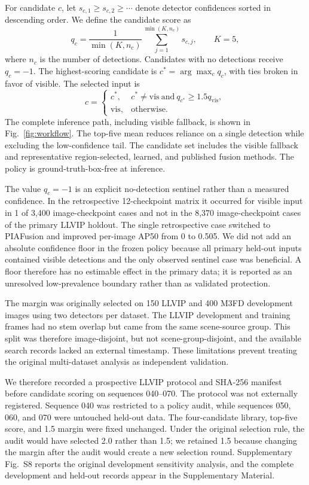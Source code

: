 \documentclass[preprint,11pt]{elsarticle}
\begin{document}
For candidate \(c\), let \(s_{c,1}\ge s_{c,2}\ge\cdots\) denote detector
confidences sorted in descending order. We define the candidate score as
\begin{equation}
q_c=\frac{1}{\min(K,n_c)}
\sum_{j=1}^{\min(K,n_c)}s_{c,j},
\qquad K=5,
\end{equation}
where \(n_c\) is the number of detections. Candidates with no detections receive
\(q_c=-1\). The highest-scoring candidate is
\(c^\ast=\arg\max_c q_c\), with ties broken in favor of visible. The selected
input is
\begin{equation}
c=
\begin{cases}
c^\ast, & c^\ast\ne\mathrm{vis}\ \text{and}\ q_{c^\ast}\ge1.5q_{\mathrm{vis}},\\
\mathrm{vis}, & \text{otherwise}.
\end{cases}
\end{equation}
The complete inference path, including visible fallback, is shown in
Fig.~\ref{fig:workflow}. The top-five mean reduces reliance on a single
detection while excluding the low-confidence tail. The candidate set includes
the visible fallback and representative region-selected, learned, and published
fusion methods. The policy is ground-truth-box-free at inference.

The value \(q_c=-1\) is an explicit no-detection sentinel rather than a
measured confidence. In the retrospective 12-checkpoint matrix it occurred for
visible input in 1 of 3,400 image-checkpoint cases and not in the 8,370
image-checkpoint cases of the primary LLVIP holdout. The single retrospective
case switched to PIAFusion and improved per-image AP50 from 0 to 0.505. We did
not add an absolute confidence floor in the frozen policy because all primary
held-out inputs contained visible detections and the only observed sentinel
case was beneficial. A floor therefore has no estimable effect in the primary
data; it is reported as an unresolved low-prevalence boundary rather than as
validated protection.

The margin was originally selected on 150 LLVIP and 400 M3FD development
images using two detectors per dataset. The LLVIP development and training
frames had no stem overlap but came from the same scene-source group. This
split was therefore image-disjoint, but not scene-group-disjoint, and the
available search records lacked an external timestamp. These limitations
prevent treating the original multi-dataset analysis as independent
validation.

We therefore recorded a prospective LLVIP protocol and SHA-256 manifest before
candidate scoring on sequences 040--070. The protocol was not externally
registered. Sequence 040 was restricted to a policy audit, while sequences 050,
060, and 070 were untouched held-out data. The four-candidate library,
top-five score, and 1.5 margin were fixed unchanged. Under the original
selection rule, the audit would have selected 2.0 rather than 1.5; we retained
1.5 because changing the margin after the audit would create a new selection
round. Supplementary Fig.~S8 reports the original development sensitivity
analysis, and the complete development and held-out records appear in the
Supplementary Material.
\end{document}
